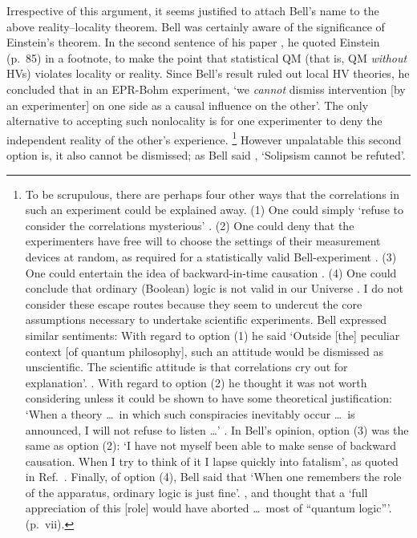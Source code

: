 \documentclass[12pt]{iopart}
\begin{document}
Irrespective of this argument, it seems justified to attach Bell's name to the above reality--locality theorem. Bell was certainly aware of the significance of Einstein's theorem. 
In the second sentence of his paper \cite{Bel64}, he quoted Einstein \cite{Ein46} (p.~85) in a footnote, to make the point that statistical QM (that is, QM {\em without} HVs) violates locality or reality. Since Bell's result ruled out local HV theories, he concluded  \cite{Bel81}
that in an EPR-Bohm experiment, `we {\em cannot} dismiss intervention [by an experimenter] on one side as a causal influence on the other'.  The only alternative to accepting such nonlocality is for one experimenter to deny the independent reality of the other's experience. 
\footnote{To be scrupulous, there are perhaps four other ways that the correlations in such an experiment could be explained away.
(1) One could simply `refuse to consider the correlations mysterious' \cite{Fra82}.
(2) One could deny that the experimenters have free will to choose the settings of their measurement devices at random, as required for a statistically valid Bell-experiment \cite{Sta71}.  
(3) One could entertain the idea of backward-in-time causation \cite{Pri96}. 
(4) One could conclude that ordinary (Boolean) logic is not valid in our Universe \cite{Bub74}. I do not consider these escape routes because they seem to undercut the core assumptions necessary to undertake scientific experiments. Bell
expressed similar sentiments: With regard to option (1) he said `Outside [the] peculiar context  [of quantum philosophy], such an attitude would be dismissed as unscientific. The scientific attitude is that correlations cry out for explanation'. \cite{Bel81}. With regard to option (2) he thought it was not worth considering unless it could be shown to have some theoretical justification:  `When a theory \ldots\ in which such conspiracies inevitably occur \ldots\ is announced, I will not refuse to listen \ldots' \cite{Bel77}. In Bell's opinion, option (3) was the same as option (2): `I have not myself been able to make sense of backward causation. When I try to think of it I lapse quickly into fatalism', as quoted in Ref.~\cite{Pri96}. Finally, of option (4), Bell said that `When one remembers the role of the apparatus, ordinary logic is just fine'. \cite{Bel90}, and thought that a `full appreciation of this [role] would have aborted \ldots\ most of ``quantum logic'''. \cite{Bel87} (p.~vii). } 
However unpalatable this second option is, 
it also cannot be dismissed; as Bell said \cite{Bel81a},  `Solipsism cannot be refuted'. 
\end{document}
